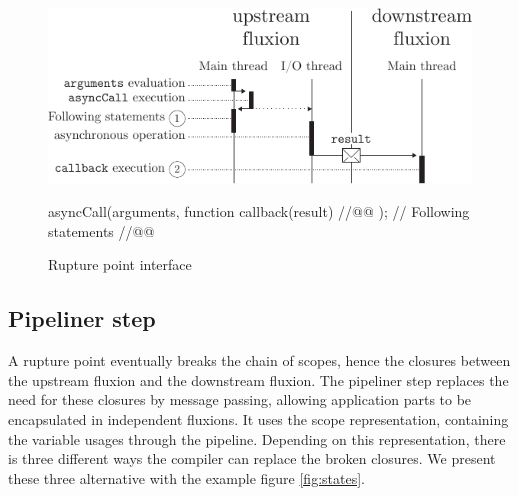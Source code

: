 
\begin{figure}[h!]
\begin{center}
  \includegraphics[width=\linewidth]{ressources/basicrp.pdf}
  \begin{code}
asyncCall(arguments, function callback(result){ //@@ });
// Following statements //@@
  \end{code}
  \caption{Rupture point interface}
  \label{fig:basicrp}
\end{center}
\end{figure}




\subsection{Pipeliner step} \label{section:compiler:pipeliner}

A rupture point eventually breaks the chain of scopes, hence the closures between the upstream fluxion and the downstream fluxion.
The pipeliner step replaces the need for these closures by message passing, allowing application parts to be encapsulated in independent fluxions.
It uses the scope representation, containing the variable usages through the pipeline.
Depending on this representation, there is three different ways the compiler can replace the broken closures.
We present these three alternative with the example figure \ref{fig:states}.

